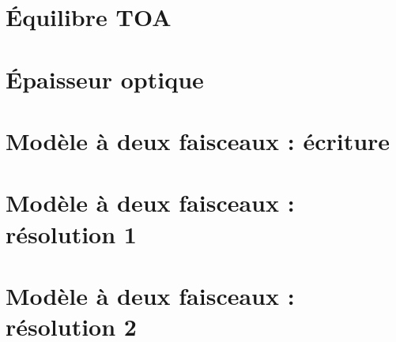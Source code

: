 \documentclass[a4paper,DIV16,10pt]{scrartcl}
\begin{document}
\newpage
\section{\'Equilibre TOA}


%

%

\section{\'Epaisseur optique}


\newpage
\section{Modèle à deux faisceaux : écriture}


\newpage
\section{Modèle à deux faisceaux : résolution 1}


\newpage
\section{Modèle à deux faisceaux : résolution 2}

\end{document}
